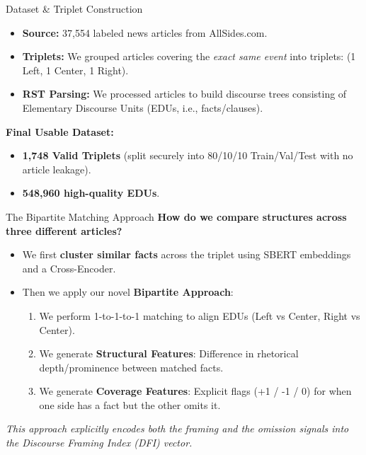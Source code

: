 \documentclass[aspectratio=169, 10pt]{beamer}
\begin{document}
\begin{frame}{Dataset \& Triplet Construction}
    \begin{itemize}
        \item \textbf{Source:} 37,554 labeled news articles from AllSides.com.
        \item \textbf{Triplets:} We grouped articles covering the \textit{exact same event} into triplets: (1 Left, 1 Center, 1 Right).
        \item \textbf{RST Parsing:} We processed articles to build discourse trees consisting of Elementary Discourse Units (EDUs, i.e., facts/clauses).
    \end{itemize}
    
    \vspace{0.4cm}
    \textbf{Final Usable Dataset:}
    \begin{itemize}
        \item \textbf{1,748 Valid Triplets} (split securely into 80/10/10 Train/Val/Test with no article leakage).
        \item \textbf{548,960 high-quality EDUs}.
    \end{itemize}
\end{frame}

\begin{frame}{The Bipartite Matching Approach}
    \textbf{How do we compare structures across three different articles?}
    \vspace{0.3cm}
    \begin{itemize}
        \item We first \textbf{cluster similar facts} across the triplet using SBERT embeddings and a Cross-Encoder.
        \item Then we apply our novel \textbf{Bipartite Approach}:
        \begin{enumerate}
            \item We perform 1-to-1-to-1 matching to align EDUs (Left vs Center, Right vs Center).
            \item We generate \textbf{Structural Features}: Difference in rhetorical depth/prominence between matched facts.
            \item We generate \textbf{Coverage Features}: Explicit flags (+1 / -1 / 0) for when one side has a fact but the other omits it.
        \end{enumerate}
    \end{itemize}
    \vspace{0.2cm}
    \textit{This approach explicitly encodes both the framing and the omission signals into the Discourse Framing Index (DFI) vector.}
\end{frame}
\end{document}
